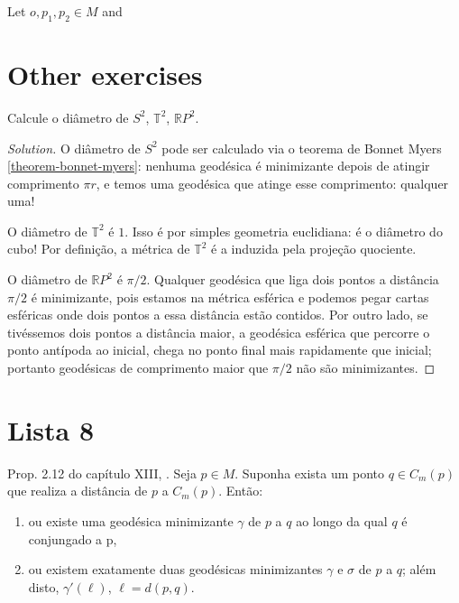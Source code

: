 \begin{theorem}
\label{theorem-toponogov-hinge}
Let $o,p_1,p_2 \in M$ and 
\end{theorem}






\section{Other exercises}
\label{section-other-exercises}

\begin{exercise}
Calcule o diâmetro de $S^2$, $\mathbb{T}^2$, $\mathbb{R}P^{2}$.
\end{exercise}

\begin{proof}[Solution]
O diâmetro de $S^2$ pode ser calculado via o teorema de Bonnet Myers
\ref{theorem-bonnet-myers}: nenhuma geodésica é minimizante depois de atingir
comprimento $\pi r$, e temos uma geodésica que atinge esse comprimento: qualquer
uma!

O diâmetro de $\mathbb{T}^2$ é $1$. Isso é por simples geometria
euclidiana: é o diâmetro do cubo! Por definição, a métrica de  $\mathbb{T}^2$ é
a induzida pela projeção quociente.

O diâmetro de $\mathbb{R}P^{2}$ é $\pi/2$. Qualquer geodésica que liga dois
pontos a distância $\pi/2$ é minimizante, pois estamos na métrica esférica e
podemos pegar cartas esféricas onde dois pontos a essa distância estão contidos. 
Por outro lado, se tivéssemos dois pontos a distância maior, a geodésica 
esférica que percorre o ponto antípoda ao inicial, chega no ponto final mais 
rapidamente que inicial; portanto geodésicas de comprimento maior que $\pi/2$ 
não são minimizantes.
\end{proof}

\section{Lista 8}
\label{section-l8}

\begin{exercise}
Prop. 2.12 do capítulo XIII, \cite{doc}. Seja $p \in M$. 
Suponha exista um ponto $q \in C_m(p)$ que realiza a distância de $p$ a 
$C_m(p)$. Então:
\begin{enumerate}
\item ou existe uma geodésica 
minimizante $\gamma$ de $p$ a $q$ ao longo da qual $q$ é 
conjungado a p,
\item ou existem exatamente duas geodésicas 
minimizantes $\gamma$ e $\sigma$ de $p$ a $q$; além disto, $\gamma'(\ell)$, 
$\ell=d(p,q)$. 
\end{enumerate}
\end{exercise}

